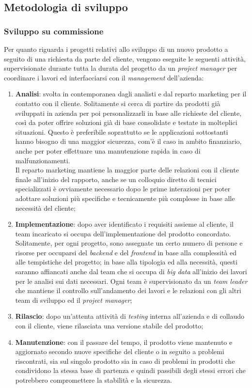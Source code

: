 \subsection{Metodologia di sviluppo}

\subsubsection{Sviluppo su commissione} \label{commissione}
Per quanto riguarda i progetti relativi allo sviluppo di un nuovo prodotto a seguito di una richiesta da parte del cliente, vengono eseguite le seguenti attività, supervisionate durante tutta la durata del progetto da un \textit{project manager} per coordinare i lavori ed interfacciarsi con il \textit{management} dell'azienda:
\begin{enumerate}
	\item \textbf{Analisi}: svolta in contemporanea dagli analisti e dal reparto marketing per il contatto con il cliente. Solitamente si cerca di partire da prodotti già sviluppati in azienda per poi personalizzarli in base alle richieste del cliente, così da poter offrire soluzioni già di base consolidate e testate in molteplici situazioni. Questo è preferibile soprattutto se le applicazioni sottostanti hanno bisogno di una maggior sicurezza, com'è il caso in ambito finanziario, anche per poter effettuare una manutenzione rapida in caso di malfunzionamenti.\\
	Il reparto marketing mantiene la maggior parte delle relazioni con il cliente finale all'inizio del rapporto, anche se un colloquio diretto di tecnici specializzati è ovviamente necessario dopo le prime interazioni per poter adottare soluzioni più specifiche e tecnicamente più complesse in base alle necessità del cliente;
	\item \textbf{Implementazione}: dopo aver identificato i requisiti assieme al cliente, il team incaricato si occupa dell'implementazione del prodotto concordato. Solitamente, per ogni progetto, sono assegnate un certo numero di persone e risorse per occuparsi del \textit{backend} e del \textit{frontend} in base alla complessità ed alle tempistiche del progetto; in base alla tipologia ed alla necessità, questi saranno affiancati anche dal team che si occupa di \textit{big data} all'inizio dei lavori per le analisi sui dati necessari. Ogni team è supervisionato da un \textit{team leader} che mantiene il controllo sull'andamento dei lavori e le relazioni con gli altri team di sviluppo ed il \textit{project manager};
	\item \textbf{Rilascio}: dopo un'attenta attività di \textit{testing} interna all'azienda e di collaudo con il cliente, viene rilasciata una versione stabile del prodotto;
	\item \textbf{Manutenzione}: con il passare del tempo, il prodotto viene mantenuto e aggiornato secondo nuove specifiche del cliente o in seguito a problemi riscontrati, sia sul singolo prodotto sia in caso di problemi in prodotti che condividono la stessa base di partenza e quindi passibili degli stessi errori che potrebbero compromettere la stabilità e la sicurezza.
\end{enumerate}

